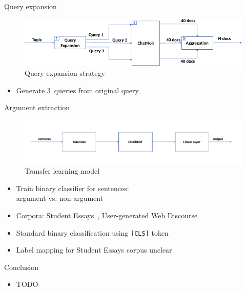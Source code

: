 \documentclass[english]{mlutalk}
\begin{document}
\begin{frame}[allowframebreaks]{Query expansion}
  \begin{figure}
    \centering
    \includegraphics[width=0.8\linewidth]{figures/distilbert-based-arg-retrieval-query-expansion.pdf}
    \caption{Query expansion strategy~\cite{AlhamzehBEM2021}}
    \label{query-expansion}
  \end{figure}

  \begin{itemize}
    \item Generate 3~queries from original query
  \end{itemize}
\end{frame}

\begin{frame}[allowframebreaks]{Argument extraction~\cite{AlhamzehBEM2021}}
  \begin{figure}
    \centering
    \includegraphics[width=0.7\linewidth]{figures/distilbert-based-arg-retrieval-processing.pdf}
    \caption{Transfer learning model~\cite{AlhamzehBEM2021}}
    \label{model}
  \end{figure}

  \begin{itemize}
    \item Train binary classifier for sentences: \\ argument vs. non-argument
    \item Corpora: Student Essays~\cite{HabernalG2017}, User-generated Web Discourse~\cite{StabG2014}
    \item Standard binary classification using \texttt{[CLS]} token
    \item Label mapping for Student Essays corpus unclear
  \end{itemize}
\end{frame}

\begin{frame}{Conclusion}
  \begin{itemize}
    \item TODO
  \end{itemize}
  \thankyou
\end{frame}

\appendix
\section{\appendixname}

\bibliographyframe
\end{document}
